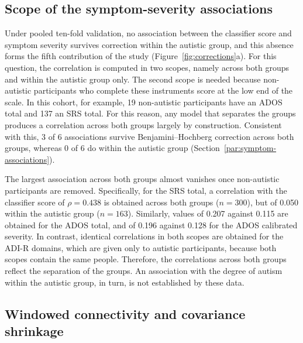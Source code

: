\subsection{Scope of the symptom-severity associations}
\label{subsec:results-symptom-severity}

Under pooled ten-fold validation, no association between the classifier score and symptom
severity survives correction within the autistic group, and this absence forms the
fifth contribution of the study (Figure~\ref{fig:corrections}a). For this question, the correlation is computed in
two scopes, namely across both groups and within the autistic group only. The second scope
is needed because non-autistic participants who complete these instruments score at the
low end of the scale. In this cohort, for example, 19 non-autistic participants have an
ADOS total and 137 an SRS total. For this reason, any model that separates the groups
produces a correlation across both groups largely by construction. Consistent with this, 3
of 6 associations survive Benjamini--Hochberg correction across both groups, whereas 0 of 6
do within the autistic group (Section~\ref{par:symptom-associations}).

The largest association across both groups almost vanishes once non-autistic participants
are removed. Specifically, for the SRS total, a correlation with the classifier score of
$\rho=0.438$ is obtained across both groups ($n=300$), but of 0.050 within the autistic
group ($n=163$). Similarly, values of 0.207 against 0.115 are obtained for the ADOS total,
and of 0.196 against 0.128 for the ADOS calibrated severity. In contrast, identical
correlations in both scopes are obtained for the ADI-R domains, which are given only to
autistic participants, because both scopes contain the same people. Therefore, the
correlations across both groups reflect the separation of the groups. An association with
the degree of autism within the autistic group, in turn, is not established by these data.

\subsection{Windowed connectivity and covariance shrinkage}
\label{subsec:results-windowed-shrinkage}

